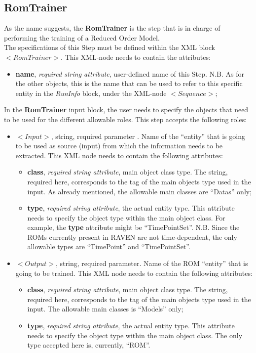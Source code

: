 \subsection{RomTrainer}
\label{subsec:stepRomTrainer}
As the name suggests, the  \textbf{RomTrainer} is the step that is in charge of performing the training of a Reduced Order Model.  
\\ The specifications of this Step must be defined within the XML block $<RomTrainer>$. This XML-node needs to contain the attributes:
\vspace{-5mm}
\begin{itemize}
\itemsep0em
\item \textbf{name}, \textit{required string attribute}, user-defined name of this Step. N.B. As for the other objects, this is the name that can be used to refer to this specific entity in the \textit{RunInfo} block, under the XML-node $<Sequence>$;
\end{itemize}
\vspace{-5mm}
In the \textbf{RomTrainer} input block, the user needs to specify the objects that need to be used for the different allowable roles. This step accepts the following roles:
\begin{itemize}
\item $<Input>$, string, required parameter . Name of the ``entity'' that is going to be used as source (input) from which the information needs to be extracted. This XML node needs to contain the following attributes:
\begin{itemize}
  \item \textbf{class}, \textit{required string attribute}, main object class type. The string, required here, corresponds to the tag of the main objects type used in the input. As already mentioned, the allowable main classes are ``Datas''  only;
  \item \textbf{type}, \textit{required string attribute}, the actual entity type. This attribute needs to specify the object type within the main object class. For example, the \textbf{type} attribute might be ``TimePointSet''. N.B. Since the ROMs currently present in RAVEN are not time-dependent, the only allowable types are ``TimePoint'' and ``TimePointSet''.
\end{itemize}
\item $<Output>$, string, required parameter. Name of the ROM ``entity'' that is going to be trained. This XML node needs to contain the following attributes:
\begin{itemize}
  \item \textbf{class}, \textit{required string attribute}, main object class type. The string, required here, corresponds to the tag of the main objects type used in the input. The allowable main classes is ``Models'' only;
  \item \textbf{type}, \textit{required string attribute}, the actual entity type. This attribute needs to specify the object type within the main object class. The only type accepted here is, currently, ``ROM''.
\end{itemize}
\end{itemize}

